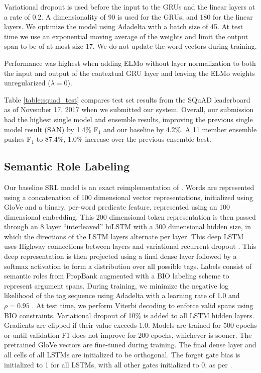 \documentclass[11pt,a4paper]{article}
\newcommand{\ELMO}{ELMo}
\begin{document}
Variational dropout is used before the input to the GRUs and the linear layers at a rate of 0.2. 
A dimensionality of 90 is used for the GRUs, and 180 for the linear layers. We optimize the model using Adadelta with a batch size of 45. At test time we use an exponential moving average of the weights and limit the output span to be of at most size 17. We do not update the word vectors during training.

Performance was highest when adding \ELMO{} without layer normalization to both the input and output of the contextual GRU layer and leaving the \ELMO{} weights unregularized ($\lambda=0$).

Table \ref{table:squad_test} compares test set results from the SQuAD leaderboard as of November 17, 2017 when we submitted our system.
Overall, our submission had the highest single model and ensemble results, improving the previous single model result (SAN) by 1.4\% F$_1$ and our baseline by 4.2\%.  A 11 member ensemble pushes F$_1$ to 87.4\%, 1.0\% increase over the previous ensemble best.


\subsection{Semantic Role Labeling}
Our baseline SRL model is an exact reimplementation of \citep{He2017DeepSR}. Words are represented using a concatenation of 100 dimensional vector representations, initialized using GloVe \citep{Pennington2014GloveGV} and a binary, per-word predicate feature, represented using an 100 dimensional embedding. This 200 dimensional token representation is then passed through an 8 layer ``interleaved'' biLSTM with a 300 dimensional hidden size, in which the directions of the LSTM layers alternate per layer. This deep LSTM uses Highway connections \citep{Srivastava2015TrainingVD} between layers and variational recurrent dropout \citep{Gal2016ATG}. This deep representation is then projected using a final dense layer followed by a softmax activation to form a distribution over all possible tags. Labels consist of semantic roles from PropBank \citep{Palmer2005propbank} augmented with a BIO labeling scheme to represent argument spans. During training, we minimize the negative log likelihood of the tag sequence using Adadelta with a learning rate of 1.0 and $\rho = 0.95$ \citep{Zeiler2012ADADELTAAA}. At test time, we perform Viterbi decoding to enforce valid spans using BIO constraints. Variational dropout of 10\% is added to all LSTM hidden layers. Gradients are clipped if their value exceeds 1.0. Models are trained for 500 epochs or until validation F1 does not improve for 200 epochs, whichever is sooner. The pretrained GloVe vectors are fine-tuned during training. The final dense layer and all cells of all LSTMs are initialized to be orthogonal. The forget gate bias is initialized to 1 for all LSTMs, with all other gates initialized to 0, as per \citep{Jzefowicz2015AnEE}.
\end{document}
